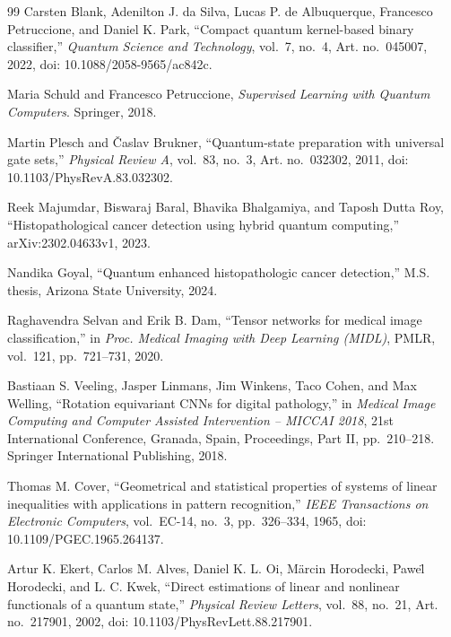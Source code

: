 \documentclass[conference]{IEEEtran}
\begin{document}
\begin{thebibliography}{99}
Carsten Blank, Adenilton J. da Silva, Lucas P. de Albuquerque, Francesco Petruccione, and Daniel K. Park, ``Compact quantum kernel-based binary classifier,'' \emph{Quantum Science and Technology}, vol.~7, no.~4, Art. no.~045007, 2022, doi: 10.1088/2058-9565/ac842c.

Maria Schuld and Francesco Petruccione, \emph{Supervised Learning with Quantum Computers}. Springer, 2018.

Martin Plesch and \v{C}aslav Brukner, ``Quantum-state preparation with universal gate sets,'' \emph{Physical Review A}, vol.~83, no.~3, Art. no.~032302, 2011, doi: 10.1103/PhysRevA.83.032302.

Reek Majumdar, Biswaraj Baral, Bhavika Bhalgamiya, and Taposh Dutta Roy, ``Histopathological cancer detection using hybrid quantum computing,'' arXiv:2302.04633v1, 2023.

Nandika Goyal, ``Quantum enhanced histopathologic cancer detection,'' M.S. thesis, Arizona State University, 2024.

Raghavendra Selvan and Erik B. Dam, ``Tensor networks for medical image classification,'' in \emph{Proc. Medical Imaging with Deep Learning (MIDL)}, PMLR, vol.~121, pp.~721--731, 2020.

Bastiaan S. Veeling, Jasper Linmans, Jim Winkens, Taco Cohen, and Max Welling, ``Rotation equivariant CNNs for digital pathology,'' in \emph{Medical Image Computing and Computer Assisted Intervention -- MICCAI 2018}, 21st International Conference, Granada, Spain, Proceedings, Part II, pp.~210--218. Springer International Publishing, 2018.

Thomas M. Cover, ``Geometrical and statistical properties of systems of linear inequalities with applications in pattern recognition,'' \emph{IEEE Transactions on Electronic Computers}, vol.~EC-14, no.~3, pp.~326--334, 1965, doi: 10.1109/PGEC.1965.264137.

Artur K. Ekert, Carlos M. Alves, Daniel K. L. Oi, M\"{a}rcin Horodecki, Pawe\"{l} Horodecki, and L. C. Kwek, ``Direct estimations of linear and nonlinear functionals of a quantum state,'' \emph{Physical Review Letters}, vol.~88, no.~21, Art. no.~217901, 2002, doi: 10.1103/PhysRevLett.88.217901.

\end{thebibliography}
\end{document}
